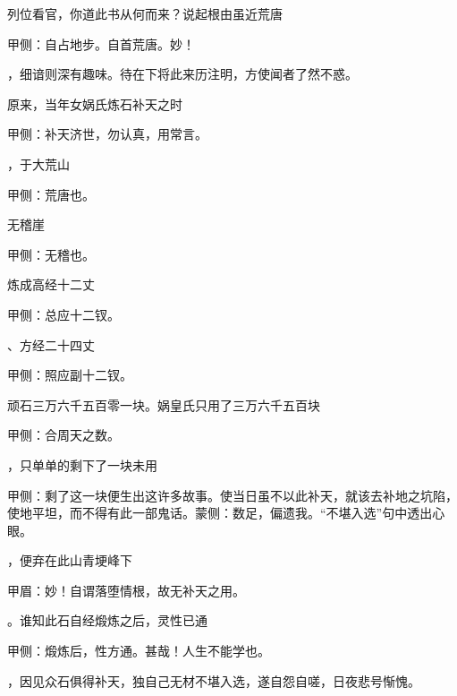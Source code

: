 \begin{parag}
    列位看官，你道此书从何而来？说起根由虽近荒唐
    \begin{note}甲侧：自占地步。自首荒唐。妙！\end{note}，细谙则深有趣味。待在下将此来历注明，方使闻者了然不惑。

\end{parag}


\begin{parag}
    原来，当年女娲氏炼石补天之时\begin{note}甲侧：补天济世，勿认真，用常言。\end{note}，于大荒山\begin{note}甲侧：荒唐也。\end{note}无稽崖\begin{note}甲侧：无稽也。\end{note}炼成高经十二丈\begin{note}甲侧：总应十二钗。\end{note}、方经二十四丈\begin{note}甲侧：照应副十二钗。\end{note}顽石三万六千五百零一块。娲皇氏只用了三万六千五百块\begin{note}甲侧：合周天之数。\end{note}，只单单的剩下了一块未用\begin{note}甲侧：剩了这一块便生出这许多故事。使当日虽不以此补天，就该去补地之坑陷，使地平坦，而不得有此一部鬼话。蒙侧：数足，偏遗我。“不堪入选”句中透出心眼。\end{note}，便弃在此山青埂峰下\begin{note}甲眉：妙！自谓落堕情根，故无补天之用。\end{note}。谁知此石自经煅炼之后，灵性已通\begin{note}甲侧：煅炼后，性方通。甚哉！人生不能学也。\end{note}，因见众石俱得补天，独自己无材不堪入选，遂自怨自嗟，日夜悲号惭愧。

\end{parag}


